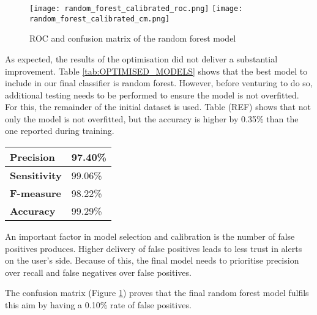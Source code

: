 \begin{figure}[!b]
	\centering
	\texttt{[image: random\_forest\_calibrated\_roc.png]}
	\texttt{[image: random\_forest\_calibrated\_cm.png]}
	\caption{ROC and confusion matrix of the random forest model}
	\label{fig:OPTIMISED_RF}
\end{figure}

As expected, the results of the optimisation did not deliver a substantial improvement. Table \ref{tab:OPTIMISED_MODELS} shows that the best model to include in our final classifier is random forest. However, before venturing to do so, additional testing needs to be performed to ensure the model is not overfitted. For this, the remainder of the initial dataset is used. Table (REF) shows that not only the model is not overfitted, but the accuracy is higher by 0.35\% than the one reported during training.

\begin{singlespace}
	\begin{center}
		\label{tab:OPTIMISED_MODELS}
		\begin{tabular}{ | m{8em} | m{5em} |}
			\hline
			\textbf{Precision}   & 97.40\% \\
			\hline
			\textbf{Sensitivity} & 99.06\% \\
			\hline
			\textbf{F-measure}   & 98.22\% \\
			\hline
			\textbf{Accuracy}    & 99.29\% \\
			\hline
		\end{tabular}
		\captionsetup{type=table}\caption{ Optimised random forest results on the 380,000 records dataset}
	\end{center}
\end{singlespace}

An important factor in model selection and calibration is the number of false positives produces. Higher delivery of false positives leads to less trust in alerts on the user's side. Because of this, the final model needs to prioritise precision over recall and false negatives over false positives.

The confusion matrix (Figure \ref{fig:OPTIMISED_RF}) proves that the final random forest model fulfils this aim by having a 0.10\% rate of false positives.

